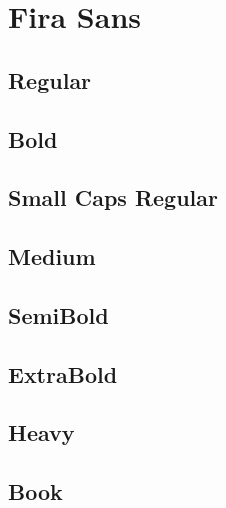 \documentclass{article}
\begin{document}
\section*{Fira Sans}

\subsection*{Regular}
\lipsum[1]


\textit{\lipsum[2]}

\subsection*{Bold}

\textbf{\lipsum[3]}

\textbf{\textit{\lipsum[4]}}


\subsection*{Small Caps Regular}

\textsc{\lipsum[5]}

\textsc{\textit{\lipsum[6]}}

\subsection*{Medium}
{\firamedium \lipsum[8]}

{\firamedium \textit{\lipsum[10]}}


\subsection*{SemiBold}
{\firasemibold \lipsum[8]}

{\firasemibold \textit{\lipsum[10]}}

\subsection*{ExtraBold}
{\firaextrabold \lipsum[8]}

{\firaextrabold \textit{\lipsum[10]}}


\subsection*{Heavy}
{\firaheavy \lipsum[8]}

{\firaheavy \textit{\lipsum[10]}}


\subsection*{Book}
{\firabook \lipsum[9]}
\end{document}
